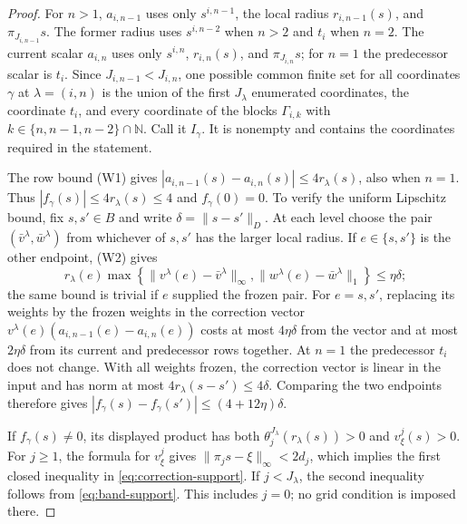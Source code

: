 \begin{proof}
For $n>1$, $a_{i,n-1}$ uses only $s^{i,n-1}$, the local radius
$r_{i,n-1}(s)$, and $\pi_{J_{i,n-1}}s$.  The former radius uses
$s^{i,n-2}$ when $n>2$ and $t_i$ when $n=2$.  The current scalar
$a_{i,n}$ uses only $s^{i,n}$, $r_{i,n}(s)$, and
$\pi_{J_{i,n}}s$; for $n=1$ the predecessor scalar is $t_i$.
Since $J_{i,n-1}<J_{i,n}$, one possible common finite set for all
coordinates $\gamma$ at $\lambda=(i,n)$ is the union of the first
$J_\lambda$ enumerated coordinates, the coordinate $t_i$, and every
coordinate of the blocks $\Gamma_{i,k}$ with
$k\in\{n,n-1,n-2\}\cap\mathbb N$.  Call it $I_\gamma$.  It is
nonempty and contains the coordinates required in the statement.

The row bound (W1) gives
$|a_{i,n-1}(s)-a_{i,n}(s)|\leq4r_\lambda(s)$, also when $n=1$.
Thus $|f_\gamma(s)|\leq4r_\lambda(s)\leq4$ and
$f_\gamma(0)=0$.  To verify the uniform Lipschitz bound, fix
$s,s'\in B$ and write $\delta=\|s-s'\|_D$.  At each level
choose the pair $(\bar v^\lambda,\bar w^\lambda)$ from whichever
of $s,s'$ has the larger local radius.  If $e\in\{s,s'\}$ is the
other endpoint, (W2) gives
\[
 r_\lambda(e)\max\!\left\{
    \|v^\lambda(e)-\bar v^\lambda\|_\infty,
    \|w^\lambda(e)-\bar w^\lambda\|_1\right\}
 \leq\eta\delta;
\]
the same bound is trivial if $e$ supplied the frozen pair.  For
$e=s,s'$, replacing its weights by the frozen weights in the
correction vector
$v^\lambda(e)(a_{i,n-1}(e)-a_{i,n}(e))$ costs at most
$4\eta\delta$ from the vector and at most $2\eta\delta$
from its current and predecessor rows together.  At $n=1$ the
predecessor $t_i$ does not change.  With all weights frozen, the
correction vector is linear in the input and has norm at most
$4r_\lambda(s-s')\leq4\delta$.  Comparing the two endpoints
therefore gives $|f_\gamma(s)-f_\gamma(s')|
\leq(4+12\eta)\delta$.

If $f_\gamma(s)\ne0$, its displayed product has both
$\theta_j^{J_\lambda}(r_\lambda(s))>0$ and
$v^j_\xi(s)>0$.  For $j\geq1$, the formula for $v^j_\xi$ gives
$\|\pi_j s-\xi\|_\infty<2d_j$, which implies the first
closed inequality in \eqref{eq:correction-support}.  If $j<J_\lambda$, the second inequality
follows from \eqref{eq:band-support}.  This includes $j=0$;
no grid condition is imposed there.
\end{proof}
